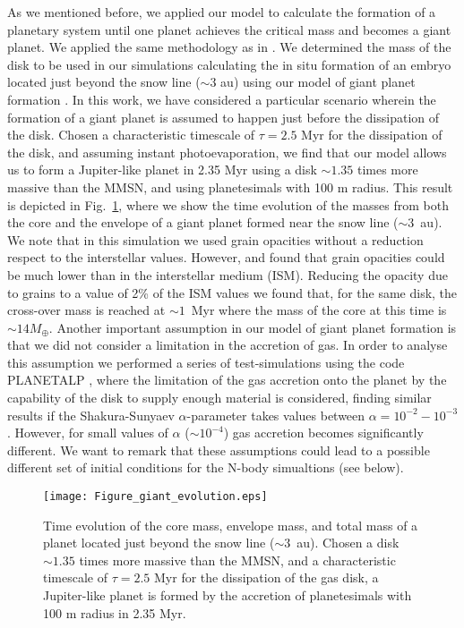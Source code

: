 \documentclass{aa}
\begin{document}
As we mentioned before, we applied our model to calculate the formation of a planetary system until one planet achieves the critical
mass and becomes a giant planet.  We applied the same methodology as in \citet{deElia2013}. We determined the
mass of the disk to be used in our simulations calculating the in situ formation of an embryo located just beyond the snow line
($\sim 3$ au) using our model of giant planet formation \citep{Guilera2010}. In this work, we have considered a particular scenario wherein the formation of a giant planet is assumed to happen just before the dissipation of the disk. Chosen a characteristic timescale of $\tau= 2.5$ Myr for the dissipation of the disk, and assuming instant photoevaporation, we find that our model allows us to form a Jupiter-like planet in 2.35 Myr using a disk $\sim 1.35$ times more massive than the MMSN, and using planetesimals with 100 m radius. This result is depicted in Fig.~\ref{fig:giant_evolution}, where we show the time evolution of the masses from both the core and the envelope of a giant planet
formed near the snow line ($\sim 3$~au). We note that in this simulation we used grain opacities without a reduction respect to the interstellar values. However, \citet{Ormel2014} and \citet{Mordasini2014} found that  grain opacities could be much lower than in the interstellar medium (ISM). Reducing the opacity due to grains to a value of 2\% of the ISM values \citep{Hubickyj2005} we found that, for the same disk, the cross-over mass is reached at $\sim 1$~Myr where the mass of the core at this time is $\sim 14 M_{\oplus}$. Another important assumption in our model of giant planet formation is that we did not consider a limitation in the accretion of gas. In order to analyse this assumption we performed a series of test-simulations using the code P{\scriptsize{LANETA}}LP \citep{Ronco2017}, where the limitation of the gas accretion onto the planet by the capability of the disk to supply enough material is considered, finding similar results if the Shakura-Sunyaev $\alpha$-parameter \citep{Shakura1973} takes values between $\alpha= 10^{-2} - 10^{-3}$. However, for small values of $\alpha$ ($\sim 10^{-4}$) gas accretion becomes significantly different. We want to remark that these assumptions could lead to a possible different set of initial conditions for the N-body simualtions (see below).  

\begin{figure}[htb!]
\centering
\texttt{[image: Figure\_giant\_evolution.eps]}
\caption{Time evolution of the core mass, envelope mass, and total mass of a planet located just beyond the snow line ($\sim 3$~au).
Chosen a disk $\sim 1.35$ times more massive than the MMSN, and a characteristic timescale of $\tau= 2.5$ Myr for the dissipation of the
gas disk, a Jupiter-like planet is formed by the accretion of planetesimals with 100 m radius in 2.35 Myr.}
\label{fig:giant_evolution}
\end{figure}
\end{document}
